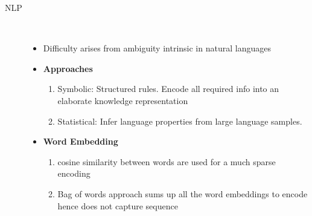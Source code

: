 \documentclass[a4paper, 10pt,landscape]{article}
\begin{document}
\begin{multicols*}{3}
\begin{description}
\begin{itemize}
			\end{itemize}
		\item[NLP]~
			\begin{itemize}
				\item Difficulty arises from ambiguity intrinsic in natural languages
				\item {\bf Approaches}
					\begin{enumerate}
						\item Symbolic: Structured rules. Encode all required info into an elaborate knowledge representation
						\item Statistical: Infer language properties from large language samples.
					\end{enumerate}
				\item {\bf Word Embedding}
					\begin{enumerate}
						\item cosine similarity between words are used for a much sparse encoding
						\item Bag of words approach sums up all the word embeddings to encode hence does not capture sequence
					\end{enumerate}
			\end{itemize}
					
\end{description}





\end{multicols*}
\end{document}
